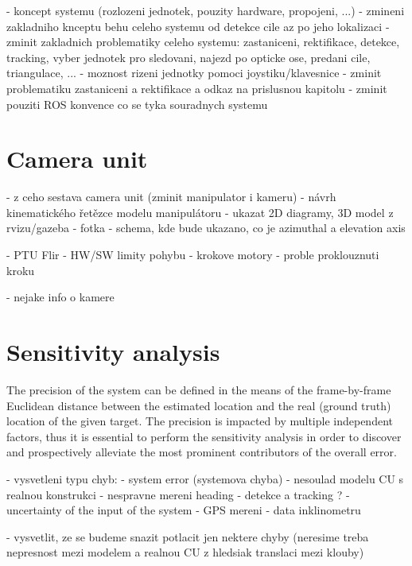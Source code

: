 - koncept systemu (rozlozeni jednotek, pouzity hardware, propojeni, ...)
- zmineni zakladniho knceptu behu celeho systemu od detekce cile az po jeho lokalizaci
- zminit zakladnich problematiky celeho systemu: zastaniceni, rektifikace, detekce, tracking, vyber jednotek pro sledovani, najezd po opticke ose, predani cile, triangulace, ...
- moznost rizeni jednotky pomoci joystiku/klavesnice
- zminit problematiku zastaniceni a rektifikace a odkaz na prislusnou kapitolu
- zminit pouziti ROS konvence co se tyka souradnych systemu

\chapter{Camera unit} \label{txt:camera_unit}

- z ceho sestava camera unit (zminit manipulator i kameru)
- návrh kinematického řetězce modelu manipulátoru
- ukazat 2D diagramy, 3D model z rvizu/gazeba
- fotka
- schema, kde bude ukazano, co je azimuthal a elevation axis

- PTU Flir
	- HW/SW limity pohybu
	- krokove motory
	- proble proklouznuti kroku

- nejake info o kamere


\chapter{Sensitivity analysis} \label{txt:sensitivity_analysis}
The precision of the system can be defined in the means of the frame-by-frame Euclidean distance between the estimated location and the real (ground truth) location of the given target. The precision is impacted by multiple independent factors, thus it is essential to perform the sensitivity analysis in order to discover and prospectively alleviate the most prominent contributors of the overall error. 

- vysvetleni typu chyb:
	- system error (systemova chyba)
		- nesoulad modelu CU s realnou konstrukci
		- nespravne mereni heading
		- detekce a tracking ?
	- uncertainty of the input of the system
		- GPS mereni
		- data inklinometru
	
- vysvetlit, ze se budeme snazit potlacit jen nektere chyby (neresime treba nepresnost mezi modelem a realnou CU z hledsiak translaci mezi klouby)

